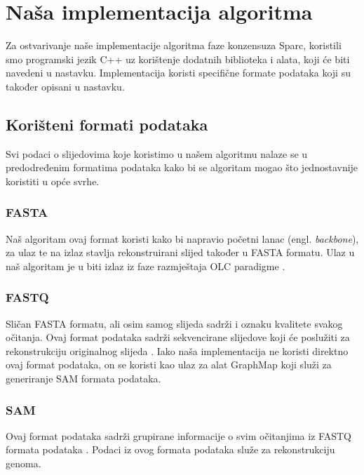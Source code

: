 \documentclass[times, utf8, seminar, numeric]{fer}
\begin{document}

\chapter{Naša implementacija algoritma}
Za ostvarivanje naše implementacije algoritma faze konzensuza Sparc, koristili smo programski jezik C++ uz korištenje dodatnih biblioteka i alata, koji će biti navedeni u nastavku. Implementacija koristi specifične formate podataka koji su također opisani u nastavku.
\section{Korišteni formati podataka}
Svi podaci o slijedovima koje koristimo u našem algoritmu nalaze se u predodređenim formatima podataka kako bi se algoritam mogao što jednostavnije koristiti u opće svrhe. 
\subsection{FASTA}
Naš algoritam ovaj format koristi kako bi napravio početni lanac (engl. \emph{backbone}), za ulaz te na izlaz stavlja rekonstruirani slijed također u FASTA formatu.
Ulaz u naš algoritam je u biti izlaz iz faze razmještaja OLC paradigme \cite[Poglavlje~1.3.1]{sikic2013bioinformatika}.
\subsection{FASTQ}
Sličan FASTA formatu, ali osim samog slijeda sadrži i oznaku kvalitete svakog očitanja.
Ovaj format podataka sadrži sekvencirane slijedove koji će poslužiti za rekonstrukciju originalnog slijeda \cite[Poglavlje~1.3.2]{sikic2013bioinformatika} .
Iako naša implementacija ne koristi direktno ovaj format podataka, on se koristi kao ulaz za alat GraphMap koji služi za generiranje SAM formata podataka. 
\subsection{SAM}
Ovaj format podataka sadrži grupirane informacije o svim očitanjima iz FASTQ formata podataka \cite{sam_format}. Podaci iz ovog formata podataka služe za rekonstrukciju genoma. 
\end{document}
